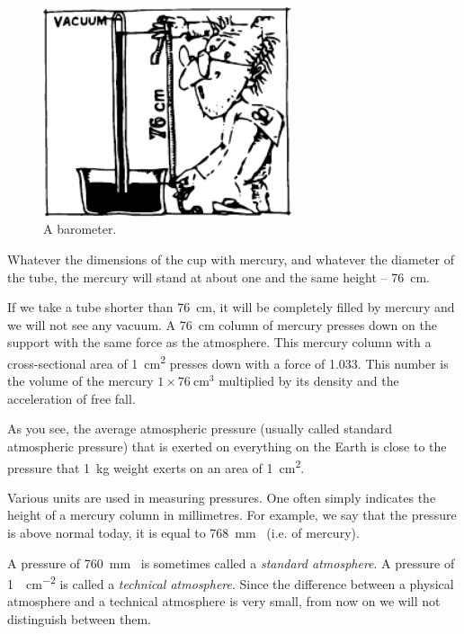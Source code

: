 \begin{figure}[!ht]
\centering
\includegraphics[width=0.65\textwidth]{figures/fig-7-4.pdf}
\caption{A barometer.}
\label{fig-7-4}
\end{figure}


Whatever the dimensions of the cup with mercury, and whatever the diameter of the tube, the mercury will stand at about one and the same height -- \SI{76}{\centi\meter}.

If we take a tube shorter than \SI{76}{\centi\meter}, it will be completely filled by mercury and we will not see any vacuum. A \SI{76}{\centi\meter} column of mercury presses down on the support with the same force as the atmosphere. This mercury column with a cross-sectional area of \SI{1}{\centi\meter\squared} presses down with a force of
\SI{1.033}{\kgf}. This number is the volume of the mercury $1 \times \SI{76}{\centi\meter\cubed}$ multiplied by its density and the acceleration of free fall.

As you see, the average atmospheric pressure (usually called standard atmospheric pressure) that is exerted on everything on the Earth is close to the pressure that \SI{1}{\kilo\gram} weight exerts on an area of \SI{1}{\centi\meter\squared}.

Various units are used in measuring pressures. One often simply indicates the height of a mercury column in millimetres. For example, we say that the pressure is above normal today, it is equal to \SI{768}{\milli\meter\mercury} (i.e. of mercury).

A pressure of \SI{760}{\milli\meter\mercury} is sometimes called a \emph{standard atmosphere}. A pressure of \SI{1}{\kgf\per\centi\meter\squared} is called a \emph{technical atmosphere}. Since the difference between a physical
atmosphere and a technical atmosphere is very small, from now on we will not distinguish between them.

